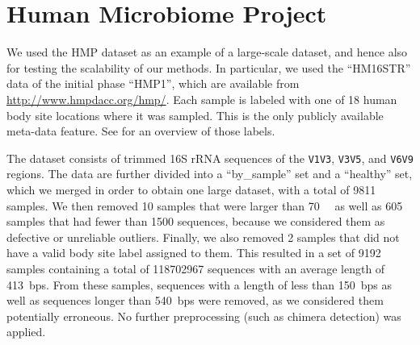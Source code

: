
\section{Human Microbiome Project}
\label{supp:sec:DetailsEmpiricalDatasets:sub:HMP}


We used the \acf{HMP} dataset \cite{Huttenhower2012,Methe2012} as an example of a large-scale dataset,
and hence also for testing the scalability of our methods.
In particular, we used the ``HM16STR'' data of the initial phase ``HMP1'',
which are available from \url{http://www.hmpdacc.org/hmp/}.
Each sample is labeled with one of \num{18} human body site locations where it was sampled.
This is the only publicly available meta-data feature.
See  for an overview of those labels.

The dataset consists of trimmed 16S rRNA sequences of the \texttt{V1V3}, \texttt{V3V5}, and \texttt{V6V9} regions.
The data are further divided into a ``by\_sample'' set and a ``healthy'' set,
which we merged in order to obtain one large dataset, with a total of \num{9 811} samples.
We then removed \num{10} samples that were larger than \SI{70}{\mega\byte}
as well as \num{605} samples that had fewer than \num{1 500} sequences,
because we considered them as defective or unreliable outliers.
Finally, we also removed \num{2} samples that did not have a valid body site label assigned to them.
This resulted in a set of \num{9 192} samples
containing a total of \num{118 702 967} sequences with an average length of \SI{413}{bps}.
From these samples, sequences with a length of less than \SI{150}{bps}
as well as sequences longer than \SI{540}{bps} were removed,
as we considered them potentially erroneous.
No further preprocessing (such as chimera detection) was applied.

